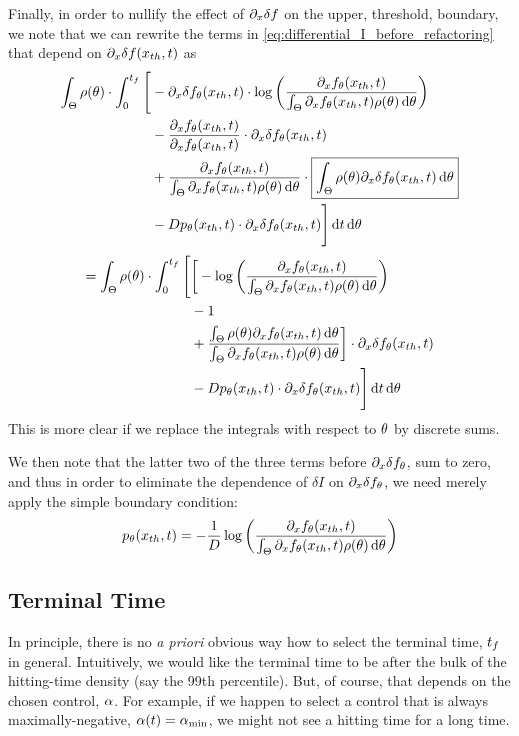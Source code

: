 \documentclass{article}
\begin{document}
Finally, in order to nullify the effect of ${\partial}_x \delta f$ on the upper,
threshold, boundary, we note that we can rewrite the terms in
\cref{eq:differential_I_before_refactoring} that depend on ${\partial}_x \delta
f({ x_{th} }, t)$ as
\begin{align*}
\int_\Theta  \rho({\theta})\cdot \int_0^{{t_f}} \Bigg[ 
&-   {\partial}_x \delta f_{\theta}({ x_{th} }, t)  \cdot 
		\log \left( \frac{{\partial}_xf_{\theta}({ x_{th} }, t)}
						{\int_\Theta {\partial}_xf_{\theta}({ x_{th} }, t)\rho({\theta})\, \mathrm{d} {\theta} } \right)
\\ 
	&-  \frac{ {\partial}_x f_{\theta}({ x_{th} }, t)}{ {\partial}_x f_{\theta}({ x_{th} }, t)}  \cdot {\partial}_x
		\delta f_{\theta}({ x_{th} }, t)
\\ 
	&+    \frac{ {\partial}_x f_{\theta}({ x_{th} }, t)}{	{\int_\Theta {\partial}_xf_{\theta}({ x_{th} },
	t)\rho({\theta})\, \mathrm{d} {\theta} }} \cdot
		 \boxed{\int_\Theta \rho({\theta}) {\partial}_x \delta f_{\theta}({ x_{th} }, t) 	\, \mathrm{d} {\theta}}				 
\\ 
 &-   D p_{\theta}({ x_{th} },t) \cdot {\partial}_x\delta f_{\theta}({ x_{th} },t) \Bigg] \, \mathrm{d} t	\, \mathrm{d} {\theta}	   
 \end{align*}
 \begin{align*}
 =
 \int_\Theta  \rho({\theta})\cdot \int_0^{{t_f}} \Bigg[ 
& \bigg[ - \log \left( \frac{{\partial}_xf_{\theta}({ x_{th} }, t)}
						{\int_\Theta {\partial}_xf_{\theta}({ x_{th} }, t)\rho({\theta})\, \mathrm{d} {\theta} } \right)
\\ 
	&- 1
\\ 
	&+    \frac{ \int_\Theta \rho({\theta}){\partial}_x f_{\theta}({ x_{th} }, t)\, \mathrm{d} {\theta}}
	     		{	{\int_\Theta {\partial}_xf_{\theta}({ x_{th} },	t)\rho({\theta})\, \mathrm{d} {\theta} }} 
		 \bigg]  \cdot {\partial}_x \delta f_{\theta}({ x_{th} }, t)				 
\\ 
 &-   D p_{\theta}({ x_{th} },t) \cdot {\partial}_x\delta f_{\theta}({ x_{th} },t) \Bigg] \, \mathrm{d} t	\, \mathrm{d} {\theta}
\end{align*}
This is more clear if we replace the integrals with respect to ${\theta}$ by discrete
sums. 

We then note that the latter two of the three terms before ${\partial}_x \delta
f_{\theta}$, sum to zero, and thus in order to eliminate the dependence of  $\delta
I$ on ${\partial}_x \delta f_{\theta}$, we need merely apply the simple boundary
condition: 
$$ p_{\theta}({ x_{th} },t) = - \frac 1D \log\left( \frac{{\partial}_xf_{\theta}({ x_{th} }, t)}
						{\int_\Theta {\partial}_xf_{\theta}({ x_{th} }, t)\rho({\theta})\, \mathrm{d} {\theta} } \right) $$

\subsection{Terminal Time}
In principle, there is no {\sl a priori} obvious way how to select the terminal
time, ${t_f}$ in general. Intuitively, we would like the terminal time to be after
the bulk of the hitting-time density (say the 99th percentile). But, of course,
that depends on the chosen control, ${\alpha}$. For example, if we happen to select a
control that is always maximally-negative, ${\alpha}(t) = { {\alpha}_{\textrm{min}} }$, we might not see a
hitting time for a long time.
\end{document}
